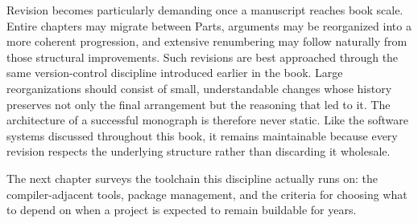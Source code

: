 Revision becomes particularly demanding once a manuscript reaches book scale. Entire chapters may migrate between Parts, arguments may be reorganized into a more coherent progression, and extensive renumbering may follow naturally from those structural improvements. Such revisions are best approached through the same version-control discipline introduced earlier in the book. Large reorganizations should consist of small, understandable changes whose history preserves not only the final arrangement but the reasoning that led to it. The architecture of a successful monograph is therefore never static. Like the software systems discussed throughout this book, it remains maintainable because every revision respects the underlying structure rather than discarding it wholesale.

The next chapter surveys the toolchain this discipline actually runs on: the compiler-adjacent tools, package management, and the criteria for choosing what to depend on when a project is expected to remain buildable for years.
